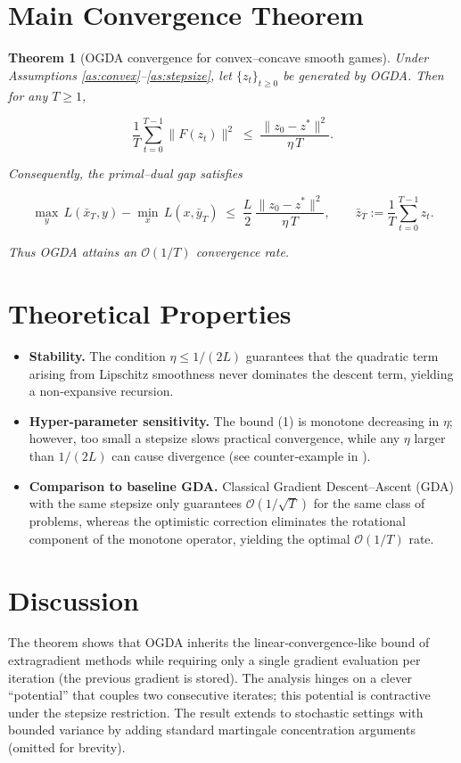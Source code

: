 \documentclass{article}
\newtheorem{theorem}{Theorem}
\begin{document}
\section*{Main Convergence Theorem}
\begin{theorem}[OGDA convergence for convex–concave smooth games]\label{thm:ogda}
Under Assumptions \ref{as:convex}–\ref{as:stepsize}, let \(\{z_{t}\}_{t\ge0}\) be generated by OGDA. Then for any \(T\ge1\),

\[
\frac{1}{T}\sum_{t=0}^{T-1}\|F(z_{t})\|^{2}
\;\le\;
\frac{\|z_{0}-z^{*}\|^{2}}{\eta\,T}.
\tag{1}
\]

Consequently, the primal–dual gap satisfies  

\[
\max_{y}\,L(\bar x_{T},y)-\min_{x}\,L(x,\bar y_{T})
\;\le\;
\frac{L}{2}\,\frac{\|z_{0}-z^{*}\|^{2}}{\eta\,T},
\qquad
\bar z_{T}:=\frac{1}{T}\sum_{t=0}^{T-1}z_{t}.
\tag{2}
\]

Thus OGDA attains an \(\mathcal O(1/T)\) convergence rate.
\end{theorem}

\section*{Theoretical Properties}
\begin{itemize}[leftmargin=*]
\item \textbf{Stability.} The condition \(\eta\le 1/(2L)\) guarantees that the quadratic term arising from Lipschitz smoothness never dominates the descent term, yielding a non‑expansive recursion.
\item \textbf{Hyper‑parameter sensitivity.} The bound (1) is monotone decreasing in \(\eta\); however, too small a stepsize slows practical convergence, while any \(\eta\) larger than \(1/(2L)\) can cause divergence (see counter‑example in \cite{daskalakis2018training}).
\item \textbf{Comparison to baseline GDA.} Classical Gradient Descent–Ascent (GDA) with the same stepsize only guarantees \(\mathcal O(1/\sqrt{T})\) for the same class of problems, whereas the optimistic correction eliminates the rotational component of the monotone operator, yielding the optimal \(\mathcal O(1/T)\) rate.
\end{itemize}

\section*{Discussion}
The theorem shows that OGDA inherits the linear‑convergence‑like bound of extragradient methods while requiring only a single gradient evaluation per iteration (the previous gradient is stored). The analysis hinges on a clever “potential” that couples two consecutive iterates; this potential is contractive under the stepsize restriction. The result extends to stochastic settings with bounded variance by adding standard martingale concentration arguments (omitted for brevity).
\end{document}

